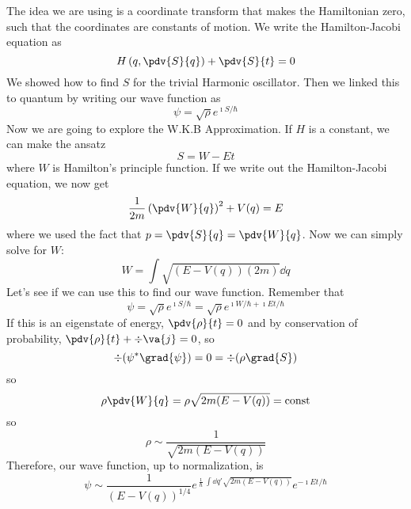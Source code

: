 \documentclass[a4paper,twoside,master.tex]{subfiles}
\begin{document}
The idea we are using is a coordinate transform that makes the Hamiltonian zero, such that the coordinates are constants of motion. We write the Hamilton-Jacobi equation as
\begin{equation}
    H\left( q, \pdv{S}{q} \right) + \pdv{S}{t} = 0
\end{equation}
We showed how to find $ S $ for the trivial Harmonic oscillator. Then we linked this to quantum by writing our wave function as
\begin{equation}
    \psi = \sqrt{\rho} e^{\imath S / \hbar}
\end{equation}
Now we are going to explore the W.K.B Approximation. If $ H $ is a constant, we can make the ansatz
\begin{equation}
    S = W - Et
\end{equation}
where $ W $ is Hamilton's principle function. If we write out the Hamilton-Jacobi equation, we now get
\begin{equation}
    \frac{1}{2m} \left( \pdv{W}{q} \right)^2 + V(q) = E
\end{equation}
where we used the fact that $ p = \pdv{S}{q} = \pdv{W}{q} $. Now we can simply solve for $ W $:
\begin{equation}
    W = \int \sqrt{(E- V(q))(2m)} \dd{q}
\end{equation}
Let's see if we can use this to find our wave function. Remember that
\begin{equation}
    \psi = \sqrt{\rho} e^{\imath S / \hbar} = \sqrt{\rho} e^{\imath W / \hbar + \imath Et / \hbar}
\end{equation}
If this is an eigenstate of energy, $ \pdv{\rho}{t} = 0 $ and by conservation of probability, $ \pdv{\rho}{t} + \div{\va{j}} = 0 $, so
\begin{equation}
    \div{(\psi^* \grad{\psi})} = 0 = \div{(\rho \grad{S})}
\end{equation}
so
\begin{equation}
    \rho \pdv{W}{q} = \rho \sqrt{2m(E-V(q))} = \text{const}
\end{equation}
so
\begin{equation}
    \rho \sim \frac{1}{\sqrt{2m(E-V(q))}}
\end{equation}
Therefore, our wave function, up to normalization, is
\begin{equation}
    \psi \sim \frac{1}{(E-V(q))^{1/4}} e^{\frac{\imath}{\hbar} \int \dd{q'} \sqrt{2m(E-V(q))}} e^{- \imath Et / \hbar}
\end{equation}
\end{document}
